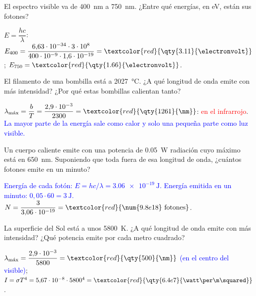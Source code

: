 \begin{exercise}
    El espectro visible va de \qty{400}{\nm} a \qty{750}{\nm}. ¿Entre qué energías, en eV, están sus fotones?
    \begin{solu}
        \(E = \dfrac{hc}{\lambda}\): \(E_{400} = \dfrac{6{,}63\cdot 10^{-34}\cdot 3\cdot 10^8}{400\cdot 10^{-9}\cdot 1{,}6\cdot 10^{-19}} = \textcolor{red}{\qty{3.11}{\electronvolt}}\);
        \(E_{750} = \textcolor{red}{\qty{1.66}{\electronvolt}}\).
    \end{solu}
\end{exercise}

\begin{exercise}
    El filamento de una bombilla está a \qty{2027}{\celsius}. ¿A qué longitud de onda emite con más intensidad? ¿Por qué estas bombillas
    calientan tanto?
    \begin{solu}
        \(\lambda_{\text{máx}} = \dfrac{b}{T} = \dfrac{2{,}9\cdot 10^{-3}}{2300} = \textcolor{red}{\qty{1261}{\nm}}\):
        \textcolor{red}{en el infrarrojo}. \textcolor{blue}{La mayor parte de la energía sale como calor y solo una pequeña parte como luz visible.}
    \end{solu}
\end{exercise}

\begin{exercise}
    Un cuerpo caliente emite con una potencia de \qty{0.05}{\watt} radiación cuyo máximo está en \qty{650}{\nm}. Suponiendo que toda
    fuera de esa longitud de onda, ¿cuántos fotones emite en un minuto?
    \begin{solu}
        \textcolor{blue}{Energía de cada fotón: \(E = hc/\lambda = \qty{3.06e-19}{\joule}\). Energía emitida en un minuto: \(0{,}05\cdot 60 = \qty{3}{\joule}\).}
        \(N = \dfrac{3}{3{,}06\cdot 10^{-19}} = \textcolor{red}{\num{9.8e18}\ \text{fotones}}\).
    \end{solu}
\end{exercise}

\begin{exercise}
    La superficie del Sol está a unos \qty{5800}{\kelvin}. ¿A qué longitud de onda emite con más intensidad? ¿Qué potencia emite por
    cada metro cuadrado?
    \begin{solu}
        \(\lambda_{\text{máx}} = \dfrac{2{,}9\cdot 10^{-3}}{5800} = \textcolor{red}{\qty{500}{\nm}}\) \textcolor{blue}{(en el centro del visible)};
        \(I = \sigma T^4 = 5{,}67\cdot 10^{-8}\cdot 5800^4 = \textcolor{red}{\qty{6.4e7}{\watt\per\m\squared}}\).
    \end{solu}
\end{exercise}

